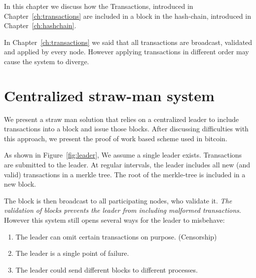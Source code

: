 
In this chapter we discuss how the Transactions, introduced in 
Chapter~\ref{ch:transactions} are included in a block in the hash-chain,
introduced in Chapter~\ref{ch:hashchain}.

In Chapter~\ref{ch:transactions} we said that all transactions are broadcast, validated and applied by every node. However applying transactions in different order may cause the system to diverge.

\section{Centralized straw-man system}
We present a straw man solution that relies on a centralized leader to include transactions into a block and issue those blocks. 
After discussing difficulties with this approach, we present the proof of work based scheme used in bitcoin.

As shown in Figure~\ref{fig:leader}, 
We assume a single leader exists. Transactions are submitted to the leader.
At regular intervals, the leader includes all new (and valid) transactions in a merkle tree. The root of the merkle-tree is included in a new block.

The block is then broadcast to all participating nodes, who validate it.
\emph{The validation of blocks prevents the leader from including malformed transactions}. 
However this system still opens several ways for the leader to misbehave:
\begin{enumerate}[label=\Alph*)]
	\item The leader can omit certain transactions on purpose. (Censorship)
	\item The leader is a single point of failure.
	\item The leader could send different blocks to different processes.
\end{enumerate}




